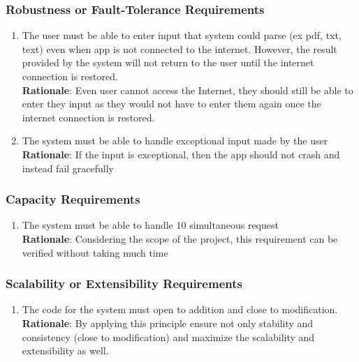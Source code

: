 \subsubsection{Robustness or Fault-Tolerance Requirements}
\label{ssub:robustness_or_fault_tolerance_requirements}
\begin{enumerate}[{PR-RFT}1. ]
	\item The user must be able to enter input that system could parse (ex pdf, txt, text) even when app is not connected to the internet. However, the result provided by the system will not return to the user until the internet connection is restored.\\ \textbf{Rationale}: Even user cannot access the Internet, they should still be able to enter they input as they would not have to enter them again once the internet connection is restored.
	\item The system must be able to handle exceptional input made by the user\\ \textbf{Rationale}: If the input is exceptional, then the app should not crash and instead fail gracefully
\end{enumerate}

\subsubsection{Capacity Requirements}
\label{ssub:capacity_requirements}
\begin{enumerate}[{PR-C}1. ]
	\item The system must be able to handle 10 simultaneous request\\ \textbf{Rationale}: Considering the scope of the project, this requirement can be verified without taking much time	
\end{enumerate}

\subsubsection{Scalability or Extensibility Requirements}
\label{ssub:scalability_or_extensibility_requirements}
\begin{enumerate}[{PR-SE}1. ]
	\item The code for the system must open to addition and close to modification.\\ \textbf{Rationale}: By applying this principle ensure not only stability and consistency (close to modification) and maximize 	the scalability and extensibility as well.
\end{enumerate}

